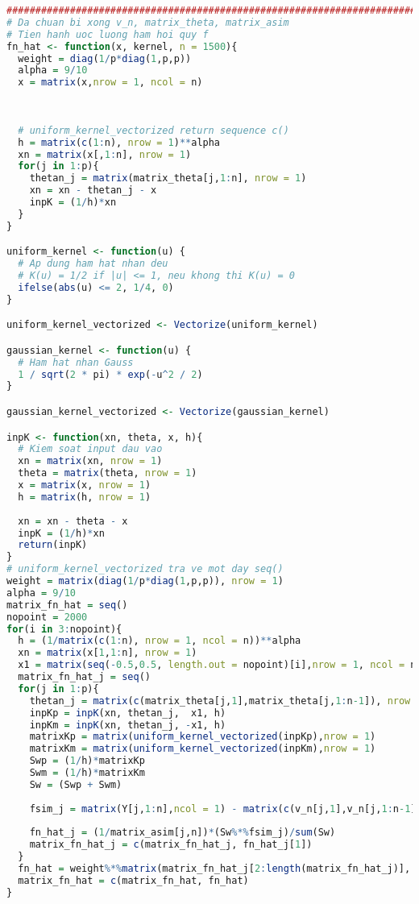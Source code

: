 \begin{lstlisting}[language=R, title = Phần 6: Ước lượng hàm hồi quy $f$ và vẽ hình minh họa]
###########################################################################
# Da chuan bi xong v_n, matrix_theta, matrix_asim
# Tien hanh uoc luong ham hoi quy f
fn_hat <- function(x, kernel, n = 1500){
  weight = diag(1/p*diag(1,p,p))
  alpha = 9/10
  x = matrix(x,nrow = 1, ncol = n)
  
  
  
  # uniform_kernel_vectorized return sequence c()
  h = matrix(c(1:n), nrow = 1)**alpha
  xn = matrix(x[,1:n], nrow = 1)
  for(j in 1:p){
    thetan_j = matrix(matrix_theta[j,1:n], nrow = 1)
    xn = xn - thetan_j - x
    inpK = (1/h)*xn
  }  
}

uniform_kernel <- function(u) {
  # Ap dung ham hat nhan deu
  # K(u) = 1/2 if |u| <= 1, neu khong thi K(u) = 0
  ifelse(abs(u) <= 2, 1/4, 0)
}

uniform_kernel_vectorized <- Vectorize(uniform_kernel)

gaussian_kernel <- function(u) {
  # Ham hat nhan Gauss
  1 / sqrt(2 * pi) * exp(-u^2 / 2)
}

gaussian_kernel_vectorized <- Vectorize(gaussian_kernel)

inpK <- function(xn, theta, x, h){
  # Kiem soat input dau vao
  xn = matrix(xn, nrow = 1)
  theta = matrix(theta, nrow = 1)
  x = matrix(x, nrow = 1)
  h = matrix(h, nrow = 1)
  
  xn = xn - theta - x
  inpK = (1/h)*xn
  return(inpK)
}
# uniform_kernel_vectorized tra ve mot day seq()
weight = matrix(diag(1/p*diag(1,p,p)), nrow = 1)
alpha = 9/10
matrix_fn_hat = seq()
nopoint = 2000
for(i in 3:nopoint){
  h = (1/matrix(c(1:n), nrow = 1, ncol = n))**alpha
  xn = matrix(x[1,1:n], nrow = 1)
  x1 = matrix(seq(-0.5,0.5, length.out = nopoint)[i],nrow = 1, ncol = n) 
  matrix_fn_hat_j = seq()
  for(j in 1:p){
    thetan_j = matrix(c(matrix_theta[j,1],matrix_theta[j,1:n-1]), nrow = 1, ncol = n)
    inpKp = inpK(xn, thetan_j,  x1, h)
    inpKm = inpK(xn, thetan_j, -x1, h)
    matrixKp = matrix(uniform_kernel_vectorized(inpKp),nrow = 1)
    matrixKm = matrix(uniform_kernel_vectorized(inpKm),nrow = 1)
    Swp = (1/h)*matrixKp
    Swm = (1/h)*matrixKm
    Sw = (Swp + Swm)
    
    fsim_j = matrix(Y[j,1:n],ncol = 1) - matrix(c(v_n[j,1],v_n[j,1:n-1]), ncol = 1)
    
    fn_hat_j = (1/matrix_asim[j,n])*(Sw%*%fsim_j)/sum(Sw)
    matrix_fn_hat_j = c(matrix_fn_hat_j, fn_hat_j[1])
  }
  fn_hat = weight%*%matrix(matrix_fn_hat_j[2:length(matrix_fn_hat_j)], ncol = 1, nrow = length(matrix_fn_hat_j[2:length(matrix_fn_hat_j)]))
  matrix_fn_hat = c(matrix_fn_hat, fn_hat)
}
  

\end{lstlisting}
